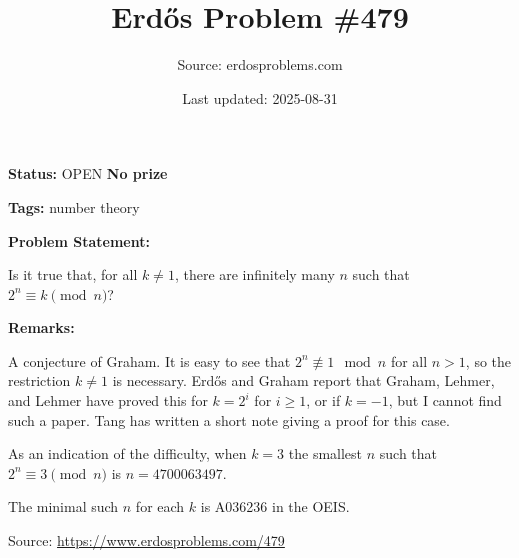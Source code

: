 \documentclass{article}
\title{Erd\H{o}s Problem \#479}
\date{Last updated: 2025-08-31}
\author{Source: erdosproblems.com}
\begin{document}
\maketitle

\noindent\textbf{Status:} OPEN \quad \textbf{No prize}

\noindent\textbf{Tags:} number theory

\medskip
\noindent\textbf{Problem Statement:}

Is it true that, for all $k\neq 1$, there are infinitely many $n$ such that $2^n\equiv k\pmod{n}$?

\bigskip
\noindent\textbf{Remarks:}

A conjecture of Graham. It is easy to see that $2^n\not\equiv 1\mod{n}$ for all $n>1$, so the restriction $k\neq 1$ is necessary. Erd\H{o}s and Graham report that Graham, Lehmer, and Lehmer have proved this for $k=2^i$ for $i\geq 1$, or if $k=-1$, but I cannot find such a paper. Tang has written a short note giving a proof for this case.

As an indication of the difficulty, when $k=3$ the smallest $n$ such that $2^n\equiv 3\pmod{n}$ is $n=4700063497$. 

The minimal such $n$ for each $k$ is A036236 in the OEIS.

\bigskip
\noindent\small{Source: \url{https://www.erdosproblems.com/479}}
\end{document}
